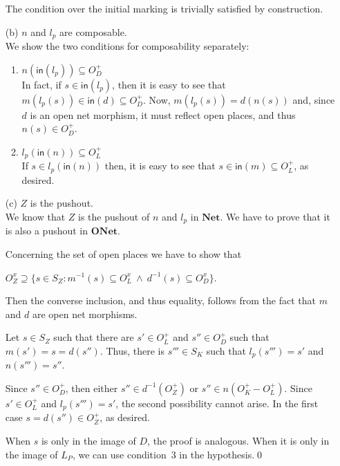 \documentclass{LMCS}
\newcommand{\inp}[1]{\ensuremath{\mathsf{in}({#1})}}
\newcommand{\onet}{\ensuremath{\mathbf{ONet}}}
\newcommand{\net}{\ensuremath{\mathbf{Net}}}
\begin{document}
\begin{enumerate}[({a}.1)]
\begin{enumerate}[$-$]
    \end{enumerate}
    The condition over the initial marking is trivially satisfied by
    construction.

    \medskip

  \item[(b)] $n$ and $l_p$ are composable.\\
    We show the two conditions for composability separately:
    \begin{enumerate}[$-$]

    \item $n(\inp{l_p}) \subseteq O_D^+$\\
      In fact, if $s \in \inp{l_p}$, then it is easy to see that $m(l_p(s)) \in
      \inp{d} \subseteq O_D^+$.  Now, $m(l_p(s)) = d(n(s))$ and, since $d$ is an
      open net morphism, it must reflect open places, and thus $n(s) \in
      O_D^+$.
  
    \item $l_p(\inp{n}) \subseteq O_L^+$\\
      If $s \in l_p(\inp{n})$ then, it is easy to see that $s \in \inp{m}
      \subseteq O_L^+$, as desired.
    \end{enumerate}
    
    \medskip

  \item[(c)] $Z$ is the pushout.\\
    We know that $Z$ is the pushout of $n$ and $l_p$ in $\net$. We have to prove
    that it is also a pushout in $\onet$. 
  
    Concerning the set of open places we have to show that
    \begin{center}
      $O_{Z}^x \supseteq \{ s \in S_Z : m^{-1}(s) \subseteq
      O_{L}^x\ \wedge\ d^{-1}(s) \subseteq O_{D}^x \}$.
    \end{center}
    Then the converse inclusion, and thus equality, follows from the
    fact that $m$ and $d$ are open net morphisms.

    Let $s \in S_Z$ such that there are $s' \in O_L^+$ and $s'' \in O_D^+$ such
    that $m(s') = s = d(s'')$. Thus, there is $s''' \in S_K$ such that
    $l_p(s''') = s'$ and $n(s''') = s''$.
    
    Since $s'' \in O_D^+$, then either $s'' \in d^{-1}(O_Z^+)$ or $s'' \in
    n(O_K^+ - O_L^+)$. Since $s' \in O_L^+$ and $l_p(s''') = s'$, the second
    possibility cannot arise. In the first case $s = d(s'') \in O_Z^+$, as
    desired.

    When $s$ is only in the image of $D$, the proof is analogous. When it is
    only in the image of $L_P$, we can use condition~3 in the hypothesis.\qed
  \end{enumerate}
\end{document}
